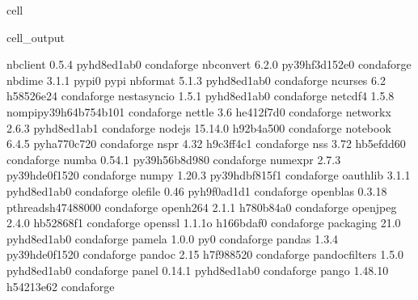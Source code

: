 \documentclass[letterpaper,table,10pt,english]{jupyterBook}
\begin{document}
\begin{sphinxuseclass}{cell}
\begin{sphinxVerbatimOutput}
\begin{sphinxuseclass}{cell_output}
\begin{sphinxVerbatim}[commandchars=\\\{\}]
nbclient                  0.5.4              pyhd8ed1ab\PYGZus{}0    conda\PYGZhy{}forge
nbconvert                 6.2.0            py39hf3d152e\PYGZus{}0    conda\PYGZhy{}forge
nbdime                    3.1.1                    pypi\PYGZus{}0    pypi
nbformat                  5.1.3              pyhd8ed1ab\PYGZus{}0    conda\PYGZhy{}forge
ncurses                   6.2                  h58526e2\PYGZus{}4    conda\PYGZhy{}forge
nest\PYGZhy{}asyncio              1.5.1              pyhd8ed1ab\PYGZus{}0    conda\PYGZhy{}forge
netcdf4                   1.5.8           nompi\PYGZus{}py39h64b754b\PYGZus{}101    conda\PYGZhy{}forge
nettle                    3.6                  he412f7d\PYGZus{}0    conda\PYGZhy{}forge
networkx                  2.6.3              pyhd8ed1ab\PYGZus{}1    conda\PYGZhy{}forge
nodejs                    15.14.0              h92b4a50\PYGZus{}0    conda\PYGZhy{}forge
notebook                  6.4.5              pyha770c72\PYGZus{}0    conda\PYGZhy{}forge
nspr                      4.32                 h9c3ff4c\PYGZus{}1    conda\PYGZhy{}forge
nss                       3.72                 hb5efdd6\PYGZus{}0    conda\PYGZhy{}forge
numba                     0.54.1           py39h56b8d98\PYGZus{}0    conda\PYGZhy{}forge
numexpr                   2.7.3            py39hde0f152\PYGZus{}0    conda\PYGZhy{}forge
numpy                     1.20.3           py39hdbf815f\PYGZus{}1    conda\PYGZhy{}forge
oauthlib                  3.1.1              pyhd8ed1ab\PYGZus{}0    conda\PYGZhy{}forge
olefile                   0.46               pyh9f0ad1d\PYGZus{}1    conda\PYGZhy{}forge
openblas                  0.3.18          pthreads\PYGZus{}h4748800\PYGZus{}0    conda\PYGZhy{}forge
openh264                  2.1.1                h780b84a\PYGZus{}0    conda\PYGZhy{}forge
openjpeg                  2.4.0                hb52868f\PYGZus{}1    conda\PYGZhy{}forge
openssl                   1.1.1o               h166bdaf\PYGZus{}0    conda\PYGZhy{}forge
packaging                 21.0               pyhd8ed1ab\PYGZus{}0    conda\PYGZhy{}forge
pamela                    1.0.0                      py\PYGZus{}0    conda\PYGZhy{}forge
pandas                    1.3.4            py39hde0f152\PYGZus{}0    conda\PYGZhy{}forge
pandoc                    2.15                 h7f98852\PYGZus{}0    conda\PYGZhy{}forge
pandocfilters             1.5.0              pyhd8ed1ab\PYGZus{}0    conda\PYGZhy{}forge
panel                     0.14.1             pyhd8ed1ab\PYGZus{}0    conda\PYGZhy{}forge
pango                     1.48.10              h54213e6\PYGZus{}2    conda\PYGZhy{}forge

\end{sphinxVerbatim}
\end{sphinxuseclass}
\end{sphinxVerbatimOutput}
\end{sphinxuseclass}
\end{document}
